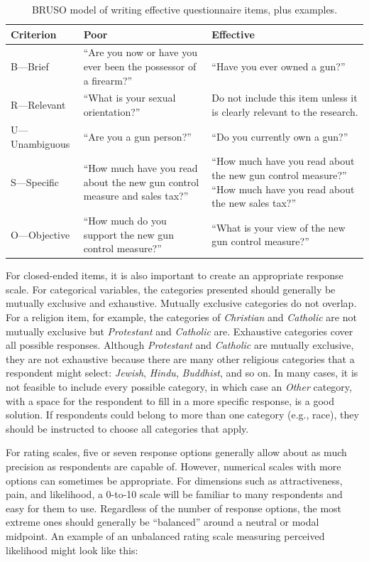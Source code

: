 \documentclass[
]{krantz}
\begin{document}
\begin{table}

\caption{\label{tab:bruso}BRUSO model of writing effective questionnaire items, plus examples.}
\centering
\begin{tabular}[t]{l|l|l}
\hline
Criterion & Poor & Effective\\
\hline
B—Brief & “Are you now or have you ever been the possessor of a firearm?” & “Have you ever owned a gun?”\\
\hline
R—Relevant & “What is your sexual orientation?” & Do not include this item unless it is clearly relevant to the research.\\
\hline
U—Unambiguous & “Are you a gun person?” & “Do you currently own a gun?”\\
\hline
S—Specific & “How much have you read about the new gun control measure and sales tax?” & “How much have you read about the new gun control measure?”  “How much have you read about the new sales tax?”\\
\hline
O—Objective & “How much do you support the new gun control measure?” & “What is your view of the new gun control measure?”\\
\hline
\end{tabular}
\end{table}

For closed-ended items, it is also important to create an appropriate response scale. For categorical variables, the categories presented should generally be mutually exclusive and exhaustive. Mutually exclusive categories do not overlap. For a religion item, for example, the categories of \emph{Christian} and \emph{Catholic} are not mutually exclusive but \emph{Protestant} and \emph{Catholic} are. Exhaustive categories cover all possible responses. Although \emph{Protestant} and \emph{Catholic} are mutually exclusive, they are not exhaustive because there are many other religious categories that a respondent might select: \emph{Jewish}, \emph{Hindu}, \emph{Buddhist}, and so on. In many cases, it is not feasible to include every possible category, in which case an \emph{Other} category, with a space for the respondent to fill in a more specific response, is a good solution. If respondents could belong to more than one category (e.g., race), they should be instructed to choose all categories that apply.

For rating scales, five or seven response options generally allow about as much precision as respondents are capable of. However, numerical scales with more options can sometimes be appropriate. For dimensions such as attractiveness, pain, and likelihood, a 0-to-10 scale will be familiar to many respondents and easy for them to use. Regardless of the number of response options, the most extreme ones should generally be ``balanced'' around a neutral or modal midpoint. An example of an unbalanced rating scale measuring perceived likelihood might look like this:
\end{document}
